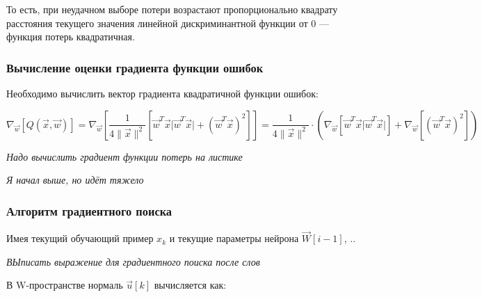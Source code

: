 \documentclass{article}
\numberwithin{equation}{subsection}
\begin{document}
То есть, при неудачном выборе потери возрастают пропорционально квадрату расстояния 
текущего значения линейной дискриминантной функции от 0 --- функция потерь
квадратичная. 




\subsubsection{Вычисление оценки градиента функции ошибок}

Необходимо вычислить вектор градиента квадратичной функции ошибок:

\begin{equation}
    \nabla_{\vec{w}} \left[ Q\left( \vec{x}, \vec{w} \right) \right] =
    \nabla_{\vec{w}} 
    \left[ 
        \dfrac{1}{4 \| \vec{x} \| ^2 } 
        \left[
            \vec{w}^T \vec{x} \lvert \vec{w}^T \vec{x} \rvert +
            \left( \vec{w}^T \vec{x} \right)^2
        \right] 
    \right] =
    \dfrac{1}{4 \| \vec{x} \| ^2 } \cdot
    \left(
        \nabla_{\vec{w}}
        \left[
            \vec{w}^T \vec{x} \lvert \vec{w}^T \vec{x} \rvert
        \right] +
        \nabla_{\vec{w}}
        \left[
            \left( \vec{w}^T \vec{x} \right)^2
        \right]
    \right)
\end{equation}

\begin{myquote}
    \textit{Надо вычислить градиент функции потерь на листике}
\end{myquote}

\begin{myquote}
    \textit{Я начал выше, но идёт тяжело}
\end{myquote}




\subsubsection{Алгоритм градиентного поиска}


Имея текущий обучающий пример $x_k$ и текущие параметры нейрона $\vec{W}[i-1]$,
..

\begin{myquote}
    \textit{ВЫписать выражение для градиентного поиска после слов}
\end{myquote}

В W-пространстве нормаль $\vec{u}[k]$ вычисляется как: 
\end{document}
